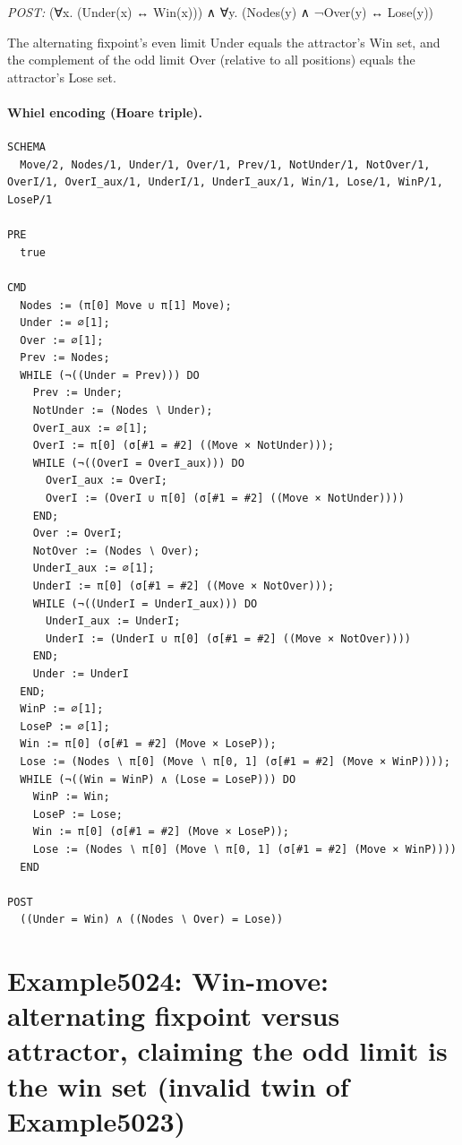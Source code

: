 \documentclass[10pt]{article}
\begin{document}
\textit{POST:} (∀x. (Under(x) ↔ Win(x))) ∧ ∀y. (Nodes(y) ∧ ¬Over(y) ↔ Lose(y))\par The alternating fixpoint's even limit Under equals the attractor's Win set, and the complement of the odd limit Over (relative to all positions) equals the attractor's Lose set.

\paragraph{Whiel encoding (Hoare triple).}

\begin{Verbatim}[fontsize=\tiny,breaklines=true,breakanywhere=true,frame=single,framesep=1.5mm]
SCHEMA
  Move/2, Nodes/1, Under/1, Over/1, Prev/1, NotUnder/1, NotOver/1, OverI/1, OverI_aux/1, UnderI/1, UnderI_aux/1, Win/1, Lose/1, WinP/1, LoseP/1

PRE
  true 

CMD
  Nodes := (π[0] Move ∪ π[1] Move);
  Under := ∅[1];
  Over := ∅[1];
  Prev := Nodes;
  WHILE (¬((Under = Prev))) DO
    Prev := Under;
    NotUnder := (Nodes ∖ Under);
    OverI_aux := ∅[1];
    OverI := π[0] (σ[#1 = #2] ((Move × NotUnder)));
    WHILE (¬((OverI = OverI_aux))) DO
      OverI_aux := OverI;
      OverI := (OverI ∪ π[0] (σ[#1 = #2] ((Move × NotUnder))))
    END;
    Over := OverI;
    NotOver := (Nodes ∖ Over);
    UnderI_aux := ∅[1];
    UnderI := π[0] (σ[#1 = #2] ((Move × NotOver)));
    WHILE (¬((UnderI = UnderI_aux))) DO
      UnderI_aux := UnderI;
      UnderI := (UnderI ∪ π[0] (σ[#1 = #2] ((Move × NotOver))))
    END;
    Under := UnderI
  END;
  WinP := ∅[1];
  LoseP := ∅[1];
  Win := π[0] (σ[#1 = #2] (Move × LoseP));
  Lose := (Nodes ∖ π[0] (Move ∖ π[0, 1] (σ[#1 = #2] (Move × WinP))));
  WHILE (¬((Win = WinP) ∧ (Lose = LoseP))) DO
    WinP := Win;
    LoseP := Lose;
    Win := π[0] (σ[#1 = #2] (Move × LoseP));
    Lose := (Nodes ∖ π[0] (Move ∖ π[0, 1] (σ[#1 = #2] (Move × WinP))))
  END

POST
  ((Under = Win) ∧ ((Nodes ∖ Over) = Lose))
\end{Verbatim}

\Needspace{0.45\textheight}

\section{Example5024: Win-move: alternating fixpoint versus attractor, claiming the odd limit is the win set (invalid twin of Example5023)}\label{case:Example5024}
\end{document}
